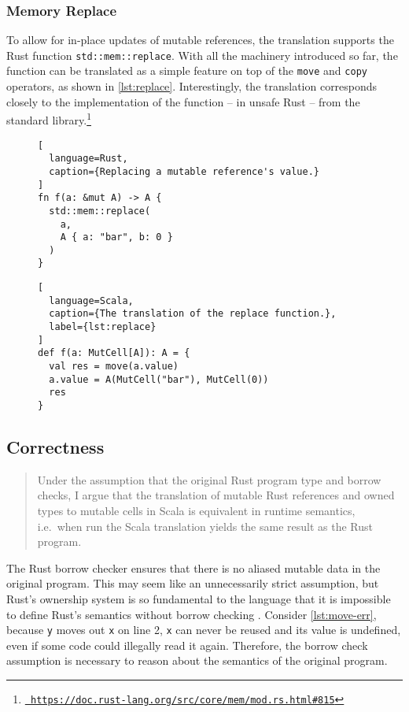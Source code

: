 \subsubsection{Memory Replace}

To allow for in-place updates of mutable references, the translation supports
the  Rust function \lstinline!std::mem::replace!. With all the machinery
introduced so far, the function can be translated as a simple feature on top of
the \lstinline!move! and \lstinline!copy! operators, as shown in
\autoref{lst:replace}. Interestingly, the translation corresponds closely to the
implementation of the function -- in unsafe Rust -- from the standard
library.\footnote{\href{}{\texttt{\color{MidnightBlue}
https://doc.rust-lang.org/src/core/mem/mod.rs.html\#815}}}

\begin{figure}
\noindent\begin{minipage}[t]{.4\textwidth}
\begin{lstlisting}[
  language=Rust,
  caption={Replacing a mutable reference's value.}
]
fn f(a: &mut A) -> A {
  std::mem::replace(
    a,
    A { a: "bar", b: 0 }
  )
}
\end{lstlisting}
\end{minipage}\hfill
\begin{minipage}[t]{.55\textwidth}
\begin{lstlisting}[
  language=Scala,
  caption={The translation of the replace function.},
  label={lst:replace}
]
def f(a: MutCell[A]): A = {
  val res = move(a.value)
  a.value = A(MutCell("bar"), MutCell(0))
  res
}
\end{lstlisting}
\end{minipage}
\end{figure}



\subsection{Correctness}
\label{correctness-claim}

\begin{quote}
Under the assumption that the original Rust program type and borrow checks, I
argue that the translation of mutable Rust references and owned types to mutable
cells in Scala is equivalent in runtime semantics, i.e.~when run the Scala
translation yields the same result as the Rust program.
\end{quote}

The Rust borrow checker ensures that there is no aliased mutable data in the
original program. This may seem like an unnecessarily strict assumption, but
Rust's ownership system is so fundamental to the language that it is impossible
to define Rust's semantics without borrow checking \cite{krust}. Consider
\autoref{lst:move-err}, because \lstinline!y! moves out \lstinline!x! on line 2,
\lstinline!x! can never be reused and its value is undefined, even if some code
could illegally read it again. Therefore, the borrow check assumption is
necessary to reason about the semantics of the original program.

